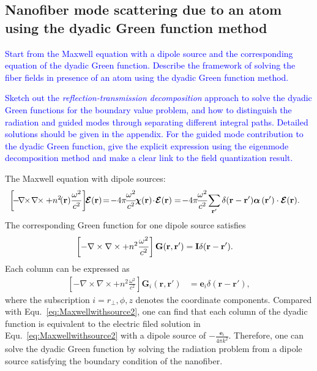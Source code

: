 \documentclass[preprint,aps,pra,onecolumn]{revtex4-1} %
\begin{document}
\subsection{Nanofiber mode scattering due to an atom using the dyadic Green function method}\label{sec:GFmethod}
\textcolor{blue}{Start from the Maxwell equation with a dipole source and the corresponding equation of the dyadic Green function. Describe the framework of solving the fiber fields in presence of an atom using the dyadic Green function method.}

\textcolor{blue}{Sketch out the \textit{reflection-transmission decomposition} approach to solve the dyadic Green functions for the boundary value problem, and how to distinguish the radiation and guided modes through separating different integral paths. Detailed solutions should be given in the appendix. For the guided mode contribution to the dyadic Green function, give the explicit expression using the eigenmode decomposition method and make a clear link to the field quantization result. }

The Maxwell equation with dipole sources:
\begin{align}\label{eq:Maxwellwithsource2}
\left[\! -\! \nabla\!\!\times\!\nabla\!\!\times + n^2\!(\br)\frac{\omega^2}{c^2} \right]\!\! \boldsymbol{\mathcal{E}}(\br) &\!=\! -4\pi\! \frac{\omega^2}{c^2}\! \boldsymbol{\chi}(\br)\! \cdot\! \boldsymbol{\mathcal{E}}(\br)=\!-4\pi\! \frac{\omega^2}{c^2}\!\sum_{\br'}\delta(\br-\br')\boldsymbol{\alpha} \, (\br')\cdot \boldsymbol{\mathcal{E}}(\br).
\end{align}
The corresponding Green function for one dipole source satisfies
\begin{align}
\left[ -\nabla\times\nabla\times + n^2\frac{\omega^2}{c^2} \right] \mathbf{G}(\mathbf{r},\mathbf{r}') &= \mathbf{I}\delta(\mathbf{r}-\mathbf{r}'). 
\end{align}
Each column can be expressed as
\begin{align}\label{eq:GFcolumneq}
\left[ -\nabla\times\nabla\times + n^2\frac{\omega^2}{c^2} \right] \mathbf{G}_i(\mathbf{r},\mathbf{r}') &= \mathbf{e}_i\delta(\mathbf{r}-\mathbf{r}'), 
\end{align}
where the subscription $ i=r\!_\perp,\phi,z $ denotes the coordinate components. Compared with Equ.~\eqref{eq:Maxwellwithsource2}, one can find that each column of the dyadic function is equivalent to the electric filed solution in Equ.~\eqref{eq:Maxwellwithsource2} with a dipole source of $-\frac{\mathbf{e}_i}{4\pi k^2}$. Therefore, one can solve the dyadic Green function by solving the radiation problem from a dipole source satisfying the boundary condition of the nanofiber.
\end{document}

